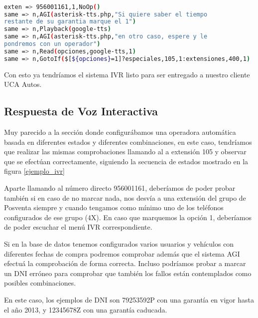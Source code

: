 \begin{lstlisting}[language=bash,title={(/etc/asterisk/extensions.conf}]

exten => 956001161,1,NoOp()
same => n,AGI(asterisk-tts.php,"Si quiere saber el tiempo 
restante de su garantia marque el 1")
same => n,Playback(google-tts)
same => n,AGI(asterisk-tts.php,"en otro caso, espere y le 
pondremos con un operador")
same => n,Read(opciones,google-tts,1)
same => n,GotoIf($[${opciones}=1]?especiales,105,1:extensiones,400,1)

\end{lstlisting}

Con esto ya tendríamos el sistema IVR listo para ser entregado a nuestro cliente UCA Autos.

\subsection{Respuesta de Voz Interactiva}

Muy parecido a la sección donde configurábamos una operadora automática basada en diferentes estados y diferentes combinaciones, en este caso, tendríamos que realizar las mismas comprobaciones llamando al a extensión 105 y observar que se efectúan correctamente, siguiendo la secuencia de estados mostrado en la figura \ref{ejemplo_ivr}

Aparte llamando al número directo 956001161, deberíamos de poder probar también si en caso de no marcar nada, nos desvía a una extensión del grupo de Posventa siempre y cuando tengamos como mínimo uno de los teléfonos configurados de ese grupo (4X). En caso que marquemos la opción 1, deberíamos de poder escuchar el menú IVR correspondiente.

Si en la base de datos tenemos configurados varios usuarios y vehículos con diferentes fechas de compra podremos comprobar además que el sistema AGI efectuá la comprobación de forma correcta. Incluso podríamos probar a marcar un DNI erróneo para comprobar que también los fallos están contemplados como posibles combinaciones.

En este caso, los ejemplos de DNI son 79253592P con una garantía en vigor hasta el año 2013, y 12345678Z con una garantía caducada.